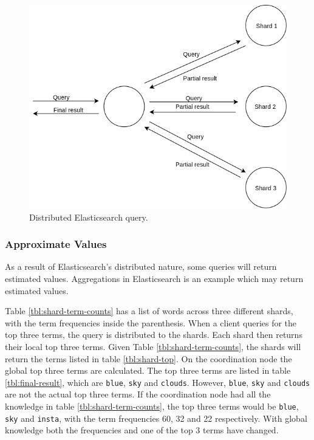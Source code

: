 \begin{figure}[h]
  \centering
  \includegraphics[width=0.9\linewidth]{img/elasticsearch-sharding.png}
  \caption{Distributed Elasticsearch query.}
  \label{fig:elasticsearch-sharding}
\end{figure}

\subsubsection{Approximate Values}
As a result of Elasticsearch's distributed nature, some queries will return estimated values.
Aggregations in Elasticsearch is an example which may return estimated values.

Table \ref{tbl:shard-term-counts} has a list of words across three different shards,
with the term frequencies inside the parenthesis.
When a client queries for the top three terms, the query is distributed to the shards.
Each shard then returns their local top three terms.
Given Table \ref{tbl:shard-term-counts},
the shards will return the terms listed in table \ref{tbl:shard-top}.
On the coordination node the global top three terms are calculated.
The top three terms are listed in table \ref{tbl:final-result}, which are \texttt{blue}, \texttt{sky} and \texttt{clouds}.
However, \texttt{blue}, \texttt{sky} and \texttt{clouds} are not the actual top three terms.
If the coordination node had all the knowledge in table \ref{tbl:shard-term-counts},
the top three terms would be \texttt{blue}, \texttt{sky} and \texttt{insta},
with the term frequencies 60, 32 and 22 respectively.
With global knowledge both the frequencies and one of the top 3 terms have changed.

